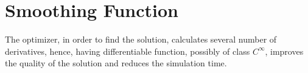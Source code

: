 		\section{Smoothing Function}\label{app:smoothing_functions}
		The optimizer, in order to find the solution, calculates several number of derivatives, hence, having differentiable function, possibly of class $C^\infty$, improves the quality of the solution and reduces the simulation time. 
		
